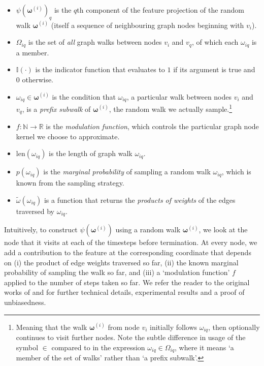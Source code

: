 \begin{itemize}
    \item  $\psi( \boldsymbol{\omega}^{(i)})_q$ is the $q$th component of the feature projection of the random walk $\boldsymbol{\omega}^{(i)}$ (itself a sequence of neighbouring graph nodes beginning with $v_i$).
    \item $\Omega_{iq}$ is the set of \emph{all} graph walks between nodes $v_i$ and $v_q$, of which each $\omega_{iq}$ is a member. 
    \item $\mathbb{I}(\cdot)$ is the indicator function that evaluates to $1$ if its argument is true and $0$ otherwise. 
    \item $\omega_{iq} \in \boldsymbol{\omega}^{(i)}$ is the condition that $\omega_{iq}$, a particular walk between nodes $v_i$ and $v_q$, is a \emph{prefix subwalk} of $\boldsymbol{\omega}^{(i)}$, the random walk we actually sample.\footnote{Meaning that the walk $\boldsymbol{\omega}^{(i)}$ from node $v_i$ initially follows $\omega_{iq}$, then optionally continues to visit further nodes. Note the subtle difference in usage of the symbol $\in$ compared to in the expression $\omega_{iq} \in \Omega_{iq}$, where it means `a member of the set of walks' rather than `a prefix subwalk'.}
    \item $f: \mathbb{N} \to \mathbb{R}$ is the \emph{modulation function}, which controls the particular graph node kernel we choose to approximate. 
    \item $\textrm{len}(\omega_{iq})$ is the length of graph walk $\omega_{iq}$.
    \item $p(\omega_{iq})$ is the \emph{marginal probability} of sampling a random walk $\omega_{iq}$, which is known from the sampling strategy.
    \item $\widetilde{\omega}(\omega_{iq})$ is a function that returns the \emph{products of weights} of the edges traversed by $\omega_{iq}$.   
\end{itemize}
Intuitively, to construct $\psi(\boldsymbol{\omega}^{(i)})$ using a random walk $\boldsymbol{\omega}^{(i)}$, we look at the node that it visits at each of the  timesteps before termination. 
At every node, we add a contribution to the feature at the corresponding coordinate that depends on (i) the product of edge weights traversed so far, (ii) the known marginal probability of sampling the walk so far, and (iii) a `modulation function' $f$ applied to the number of steps taken so far.
We refer the reader to the original works of \citet{graph_features} and \citet{reid2023universal} for further technical details, experimental results and a proof of unbiasedness. 



